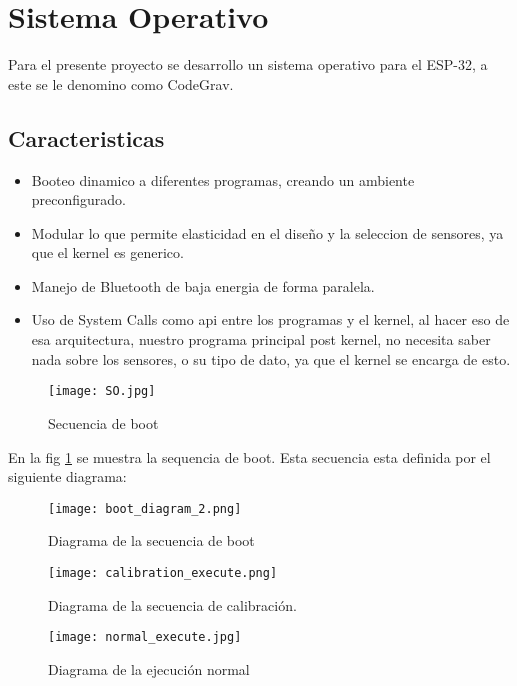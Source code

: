 \section{Sistema Operativo}
    Para el presente proyecto se desarrollo un sistema operativo
    para el ESP-32, a este se le denomino como CodeGrav.

    \subsection{Caracteristicas}
        \begin{itemize}
            \item Booteo dinamico a diferentes programas, creando un ambiente preconfigurado.
            \item Modular lo que permite elasticidad en el diseño y la seleccion de sensores, ya que el kernel es generico.
            \item Manejo de Bluetooth de baja energia de forma paralela.
            \item Uso de System Calls como \acrshort{api} entre los programas y el kernel, al hacer eso de esa arquitectura, nuestro programa principal post kernel, no necesita saber nada sobre los sensores, o su tipo de dato, 
            ya que el kernel se encarga de esto.
        \end{itemize}
    
    \begin{figure}[htp!]
        \centering
        \texttt{[image: SO.jpg]}
        \caption{Secuencia de boot}
        \label{fig: boot_sequence}
    \end{figure}
    \FloatBarrier

    En la fig \ref{fig: boot_sequence} se muestra la sequencia de boot. Esta secuencia esta
    definida por el siguiente diagrama:

    \begin{figure}[htp!]
        \centering
        \texttt{[image: boot\_diagram\_2.png]}
        \caption{Diagrama de la secuencia de boot}
        \label{fig: boot_sequence_diagram}
    \end{figure}
    \FloatBarrier

    \begin{figure}[htp!]
        \centering
        \texttt{[image: calibration\_execute.png]}
        \caption{Diagrama de la secuencia de calibración.}
        \label{fig: calibration_diagram}
    \end{figure}
    \FloatBarrier

    \begin{figure}[htp!]
        \centering
        \texttt{[image: normal\_execute.jpg]}
        \caption{Diagrama de la ejecución normal}
        \label{fig: normal_execution_diagram}
    \end{figure}
    \FloatBarrier


    

